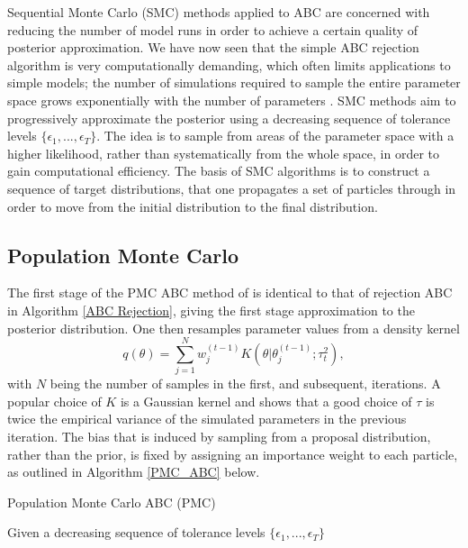\documentclass[]{article}
\begin{document}
Sequential Monte Carlo (SMC) methods applied to ABC are concerned with reducing the number of model runs in order to achieve a certain quality of posterior approximation. We have now seen that the simple ABC rejection algorithm is very computationally demanding, which often limits applications to simple models; the number of simulations required to sample the entire parameter space grows exponentially with the number of parameters \citep{RN32}. SMC methods aim to progressively approximate the posterior using a decreasing sequence of tolerance levels $\{\epsilon_1, ..., \epsilon_T\}$. The idea is to sample from areas of the parameter space with a higher likelihood, rather than systematically from the whole space, in order to gain computational efficiency. The basis of SMC algorithms is to construct a sequence of target distributions, that one propagates a set of particles through in order to move from the initial distribution to the final distribution. 

\subsection{Population Monte Carlo}

The first stage of the PMC ABC method of \cite{RN21} is identical to that of rejection ABC in Algorithm \ref{ABC Rejection}, giving the first stage approximation to the posterior distribution. One then resamples parameter values from a density kernel 
$$ q(\theta) = \sum_{j=1}^{N} w_j^{(t-1)} K(\theta| \theta_{j}^{(t-1)};\tau_t^2),$$ 
with $N$ being the number of samples in the first, and subsequent, iterations. A popular choice of $K$ is a Gaussian kernel and \cite{RN21} shows that a good choice of $\tau$ is twice the empirical variance of the simulated parameters in the previous iteration. The bias that is induced by sampling from a proposal distribution, rather than the prior, is fixed by assigning an importance weight to each particle, as outlined in Algorithm \ref{PMC_ABC} below. 


\begin{algorithm}[h]
	\caption{Population Monte Carlo ABC (PMC)}
	\label{PMC_ABC}
	Given a decreasing sequence of tolerance levels $\{\epsilon_1, ..., \epsilon_T\}$\;
\end{algorithm}	
\end{document}
